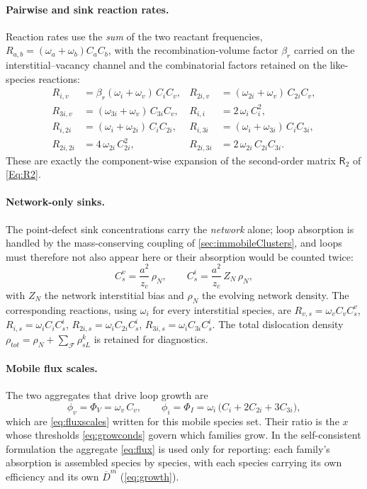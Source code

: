 \documentclass{article}
\newcommand{\spmat}[1]{\bm{\mathsf{#1}}}   %
\begin{document}
\paragraph{Pairwise and sink reaction rates.} Reaction rates use the \emph{sum}
of the two reactant frequencies, $R_{a,b}=(\omega_a+\omega_b)C_aC_b$, with the
recombination-volume factor $\beta_r$ carried on the interstitial--vacancy
channel and the combinatorial factors retained on the like-species reactions:
\begin{align}
R_{i,v}   &= \beta_r(\omega_i+\omega_v)\,C_iC_v, &
R_{2i,v}  &= (\omega_{2i}+\omega_v)\,C_{2i}C_v, \\
R_{3i,v}  &= (\omega_{3i}+\omega_v)\,C_{3i}C_v, &
R_{i,i}   &= 2\,\omega_i\,C_i^2, \\
R_{i,2i}  &= (\omega_i+\omega_{2i})\,C_iC_{2i}, &
R_{i,3i}  &= (\omega_i+\omega_{3i})\,C_iC_{3i}, \\
R_{2i,2i} &= 4\,\omega_{2i}\,C_{2i}^2, &
R_{2i,3i} &= 2\,\omega_{2i}\,C_{2i}C_{3i}.
\label{eq:rates}
\end{align}
These are exactly the component-wise expansion of the second-order matrix
$\spmat{R}_2$ of \cref{Eq:R2}.

\paragraph{Network-only sinks.} The point-defect sink concentrations carry the
\emph{network} alone; loop absorption is handled by the mass-conserving coupling
of \cref{sec:immobileClusters}, and loops must therefore not also appear here or
their absorption would be counted twice:
\begin{equation}
C_s^v=\frac{a^2}{z_c}\,\rho_N,\qquad
C_s^i=\frac{a^2}{z_c}\,Z_N\,\rho_N,
\label{eq:sinkconc}
\end{equation}
with $Z_N$ the network interstitial bias and $\rho_N$ the evolving network
density. The corresponding reactions, using $\omega_i$ for every interstitial
species, are $R_{v,s}=\omega_vC_vC_s^v$, $R_{i,s}=\omega_iC_iC_s^i$,
$R_{2i,s}=\omega_iC_{2i}C_s^i$, $R_{3i,s}=\omega_iC_{3i}C_s^i$. The total
dislocation density $\rho_{tot}=\rho_N+\sum_{\mathcal F}\rho^k_{sL}$ is retained
for diagnostics.

\paragraph{Mobile flux scales.} The two aggregates that drive loop growth are
\begin{equation}
\phi_v=\Phi_V=\omega_v\,C_v,\qquad
\phi_i=\Phi_I=\omega_i\,\bigl(C_i+2C_{2i}+3C_{3i}\bigr),
\label{eq:flux}
\end{equation}
which are \cref{eq:fluxscales} written for this mobile species set. Their ratio
is the $x$ whose thresholds \cref{eq:growconds} govern which families grow. In
the self-consistent formulation the aggregate \cref{eq:flux} is used only for
reporting: each family's absorption is assembled species by species, with each
species carrying its own efficiency and its own $\overline{D}^m$
(\cref{eq:growth}).
\end{document}
